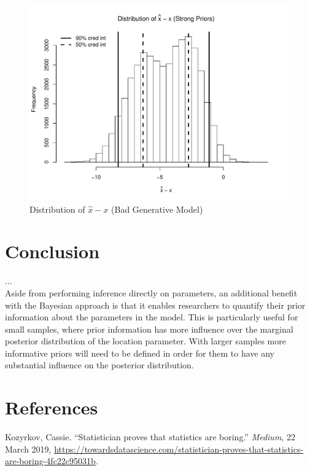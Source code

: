 \documentclass[12pt]{article}
\begin{document}
\begin{figure}[H]\caption[]{Distribution of $\hat{x}-x$ (Bad Generative Model)}
\centering
\begin{minipage}{0.6\linewidth}
\includegraphics[trim={0cm 0cm 0cm 1.5cm}, clip, scale=0.6]{../figs/norm1_pp_diff_bad.pdf}
\end{minipage}
\end{figure}

\section{Conclusion}

\noindent ... \\

\noindent Aside from performing inference directly on parameters, an additional benefit with the Bayesian approach is that it enables researchers to quantify their prior information about the parameters in the model. This is particularly useful for small samples, where prior information has more influence over the marginal posterior distribution of the location parameter. With larger samples more informative priors will need to be defined in order for them to have any substantial influence on the posterior distribution.

\pagebreak

\section{References}

\noindent Kozyrkov, Cassie. ``Statistician proves that statistics are boring.'' \emph{Medium}, 22 March 2019, \url{https://towardsdatascience.com/statistician-proves-that-statistics-are-boring-4fc22c95031b}. \\
\end{document}

